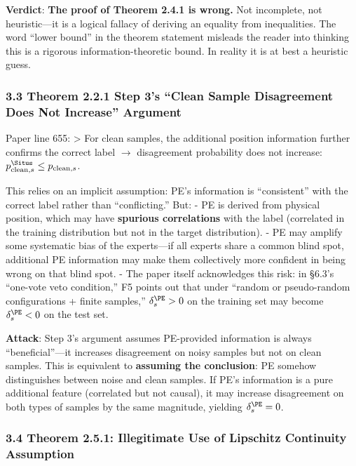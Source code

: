 \documentclass[
  12pt,
]{article}
\begin{document}
\textbf{Verdict}: \textbf{The proof of Theorem 2.4.1 is wrong.} Not incomplete, not heuristic---it is a logical fallacy of deriving an equality from inequalities. The word ``lower bound'' in the theorem statement misleads the reader into thinking this is a rigorous information-theoretic bound. In reality it is at best a heuristic guess.

\subsubsection{3.3 Theorem 2.2.1 Step 3's ``Clean Sample Disagreement Does Not Increase'' Argument}\label{clean-sample-disagreement}

Paper line 655: \textgreater{} For clean samples, the additional position information further confirms the correct label $\to$ disagreement probability does not increase: \(p_{\text{clean}, s}^{\Situs} \leq p_{\text{clean}, s}\).

This relies on an implicit assumption: PE's information is ``consistent'' with the correct label rather than ``conflicting.'' But:
- PE is derived from physical position, which may have \textbf{spurious correlations} with the label (correlated in the training distribution but not in the target distribution).
- PE may amplify some systematic bias of the experts---if all experts share a common blind spot, additional PE information may make them collectively more confident in being wrong on that blind spot.
- The paper itself acknowledges this risk: in \S6.3's ``one-vote veto condition,'' F5 points out that under ``random or pseudo-random configurations + finite samples,'' \(\delta_s^{\PE} > 0\) on the training set may become \(\delta_s^{\PE} < 0\) on the test set.

\textbf{Attack}: Step 3's argument assumes PE-provided information is always ``beneficial''---it increases disagreement on noisy samples but not on clean samples. This is equivalent to \textbf{assuming the conclusion}: PE somehow distinguishes between noise and clean samples. If PE's information is a pure additional feature (correlated but not causal), it may increase disagreement on both types of samples by the same magnitude, yielding \(\delta_s^{\PE} = 0\).

\subsubsection{3.4 Theorem 2.5.1: Illegitimate Use of Lipschitz Continuity Assumption}\label{theorem-251-lipschitz}
\end{document}
